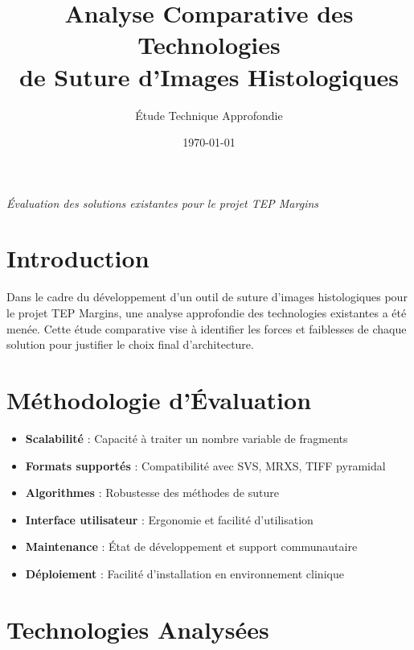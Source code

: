 \documentclass[11pt,a4paper]{article}
\title{\Huge\textbf{Analyse Comparative des Technologies\\de Suture d'Images Histologiques}}
\author{\Large Étude Technique Approfondie}
\date{\today}
\begin{document}
\maketitle

\begin{center}
\textit{\large Évaluation des solutions existantes pour le projet TEP Margins}
\end{center}

\vspace{1cm}

\tableofcontents

\newpage

\section{Introduction}

Dans le cadre du développement d'un outil de suture d'images histologiques pour le projet TEP Margins, une analyse approfondie des technologies existantes a été menée. Cette étude comparative vise à identifier les forces et faiblesses de chaque solution pour justifier le choix final d'architecture.

\section{Méthodologie d'Évaluation}

\begin{tcolorbox}[colback=TechBlue!10, colframe=TechBlue, title=Critères d'Évaluation]
\begin{itemize}[leftmargin=*]
    \item \textbf{Scalabilité} : Capacité à traiter un nombre variable de fragments
    \item \textbf{Formats supportés} : Compatibilité avec SVS, MRXS, TIFF pyramidal
    \item \textbf{Algorithmes} : Robustesse des méthodes de suture
    \item \textbf{Interface utilisateur} : Ergonomie et facilité d'utilisation
    \item \textbf{Maintenance} : État de développement et support communautaire
    \item \textbf{Déploiement} : Facilité d'installation en environnement clinique
\end{itemize}
\end{tcolorbox}

\section{Technologies Analysées}
\end{document}
